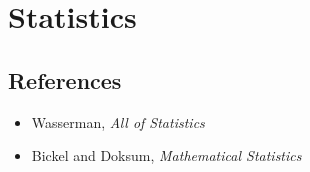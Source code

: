 \section{Statistics}
\subsection*{References}
\begin{itemize}
    \item Wasserman, \emph{All of Statistics}
    \item Bickel and Doksum, \emph{Mathematical Statistics}
\end{itemize}
